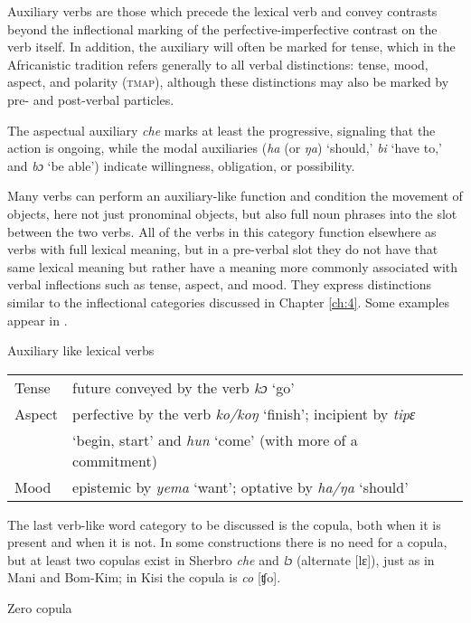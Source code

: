 Auxiliary verbs are those which precede the lexical verb and convey contrasts beyond the inflectional marking of the perfective-imperfective contrast on the verb itself. In addition, the auxiliary will often be marked for tense, which in the Africanistic tradition refers generally to all verbal distinctions: tense, mood, aspect, and polarity (\textsc{tmap}), although these distinctions may also be marked by pre- and post-verbal particles.

The aspectual auxiliary \textit{che} marks at least the progressive, signaling that the action is ongoing, while the modal auxiliaries (\textit{ha} (or \textit{ŋa}) ‘should,' \textit{bi} ‘have to,' and \textit{bɔ} ‘be able') indicate willingness, obligation, or possibility.

Many verbs can perform an auxiliary-like function and condition the movement of objects, here not just pronominal objects, but also full noun phrases into the slot between the two verbs. All of the verbs in this category function elsewhere as verbs with full lexical meaning, but in a pre-verbal slot they do not have that same lexical meaning but rather have a meaning more commonly associated with verbal inflections such as tense, aspect, and mood. They express distinctions similar to the inflectional categories discussed in Chapter \ref{ch:4}. Some examples appear in .

\ea%
    \label{ex:93} Auxiliary like lexical verbs\\
    \begin{tabular}[t]{lll}
Tense & future conveyed by the verb \textit{kɔ} ‘go'\\
Aspect & perfective by the verb \textit{ko/koŋ} ‘finish'; incipient by \textit{tipɛ}\\ 
&  ‘begin, start' and \textit{hun} ‘come' (with more of a commitment)\\
Mood & epistemic by \textit{yema} ‘want'; optative by \textit{ha/ŋa} ‘should'\\
\end{tabular}
\z

The last verb-like word category to be discussed is the copula, both when it is present and when it is not. In some constructions there is no need for a copula, but at least two copulas exist in Sherbro \textit{che} and \textit{lɔ} (alternate [lɛ]), just as in Mani and Bom-Kim; in Kisi the copula is \textit{co} [ʧo].

\ea%
    \label{ex:94}
  Zero copula\\

